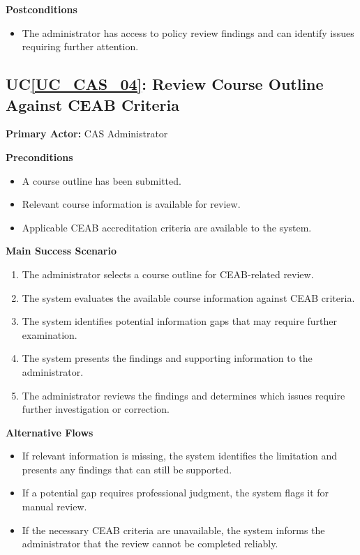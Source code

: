 \documentclass[12pt]{article}
\newcounter{ucnum} %
\newcommand{\ucref}[1]{UC\ref{#1}}
\begin{document}
\noindent \textbf{Postconditions}
\begin{itemize}
  \item The administrator has access to policy review findings and can identify issues requiring further attention.
\end{itemize}


 \label{UC_CAS_04}
\subsection{\ucref{UC_CAS_04}: Review Course Outline Against CEAB Criteria}

\noindent \textbf{Primary Actor:} CAS Administrator

\noindent \textbf{Preconditions}
\begin{itemize}
  \item A course outline has been submitted.
  \item Relevant course information is available for review.
  \item Applicable CEAB accreditation criteria are available to the system.
\end{itemize}

\noindent \textbf{Main Success Scenario}
\begin{enumerate}
  \item The administrator selects a course outline for CEAB-related review.
  \item The system evaluates the available course information against CEAB criteria.
  \item The system identifies potential information gaps that may require further examination.
  \item The system presents the findings and supporting information to the administrator.
  \item The administrator reviews the findings and determines which issues require further investigation or correction.
\end{enumerate}

\noindent \textbf{Alternative Flows}
\begin{itemize}
  \item If relevant information is missing, the system identifies the limitation and presents any findings that can still be supported.
  \item If a potential gap requires professional judgment, the system flags it for manual review.
  \item If the necessary CEAB criteria are unavailable, the system informs the administrator that the review cannot be completed reliably.
\end{itemize}
\end{document}
